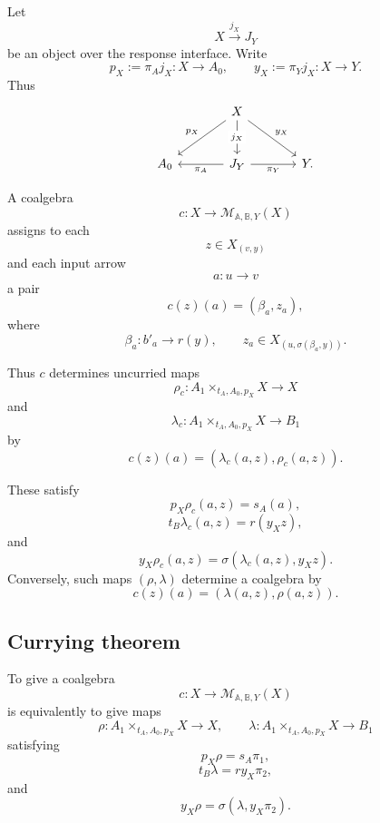 Let
\[
X\xrightarrow{j_X}J_Y
\]
be an object over the response interface.  Write
\[
p_X:=\pi_Aj_X:X\to A_0,
\qquad
y_X:=\pi_Yj_X:X\to Y.
\]
Thus
\[
\begin{tikzcd}[column sep=large,row sep=large]
&
X
  \arrow[dl,"p_X"']
  \arrow[dr,"y_X"]
  \arrow[d,"j_X" description]
&
\\
A_0
&
J_Y
  \arrow[l,"\pi_A"]
  \arrow[r,"\pi_Y"']
&
Y .
\end{tikzcd}
\]

A coalgebra
\[
c:X\to\mathcal M_{\mathbb A,\mathbb B,Y}(X)
\]
assigns to each
\[
z\in X_{(v,y)}
\]
and each input arrow
\[
a:u\to v
\]
a pair
\[
c(z)(a)=(\beta_a,z_a),
\]
where
\[
\beta_a:b'_a\to r(y),
\qquad
z_a\in X_{(u,\sigma(\beta_a,y))}.
\]

Thus \(c\) determines uncurried maps
\[
\rho_c:
A_1\times_{t_A,A_0,p_X}X\to X
\]
and
\[
\lambda_c:
A_1\times_{t_A,A_0,p_X}X\to B_1
\]
by
\[
c(z)(a)=(\lambda_c(a,z),\rho_c(a,z)).
\]

These satisfy
\[
p_X\rho_c(a,z)=s_A(a),
\]
\[
t_B\lambda_c(a,z)=r(y_Xz),
\]
and
\[
y_X\rho_c(a,z)
=
\sigma(\lambda_c(a,z),y_Xz).
\]
Conversely, such maps \((\rho,\lambda)\) determine a coalgebra by
\[
c(z)(a)=(\lambda(a,z),\rho(a,z)).
\]

\subsection{Currying theorem}
\label{subsec:poly-relative-currying-labelled-one-step}

\begin{theorem}
\label{thm:poly-relative-currying-labelled-one-step}
To give a coalgebra
\[
c:X\to\mathcal M_{\mathbb A,\mathbb B,Y}(X)
\]
is equivalently to give maps
\[
\rho:
A_1\times_{t_A,A_0,p_X}X\to X,
\qquad
\lambda:
A_1\times_{t_A,A_0,p_X}X\to B_1
\]
satisfying
\[
p_X\rho=s_A\pi_1,
\]
\[
t_B\lambda=r y_X\pi_2,
\]
and
\[
y_X\rho=\sigma(\lambda,y_X\pi_2).
\]
\end{theorem}

